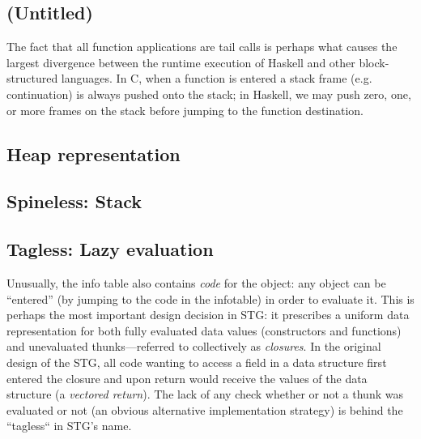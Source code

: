 \subsection{(Untitled)}

The fact that all function applications are tail calls is perhaps what
causes the largest divergence between the runtime execution of Haskell
and other block-structured languages.  In C, when a function is entered
a stack frame (e.g. continuation) is always pushed onto the stack; in
Haskell, we may push zero, one, or more frames on the stack before
jumping to the function destination.

\subsection{Heap representation}

\subsection{Spineless: Stack}





\subsection{Tagless: Lazy evaluation}

Unusually, the info table also contains \emph{code} for the object: any
object can be ``entered'' (by jumping to the code in the infotable) in
order to evaluate it.  This is perhaps the most important design
decision in STG: it prescribes a uniform data representation for both
fully evaluated data values (constructors and functions) and unevaluated
thunks---referred to collectively as \emph{closures}.  In the original
design of the STG, all code wanting to access a field in a data
structure first entered the closure and upon return would receive the
values of the data structure (a \emph{vectored return}).  The lack of
any check whether or not a thunk was evaluated or not (an obvious
alternative implementation strategy) is behind the ``tagless`` in STG's
name.


